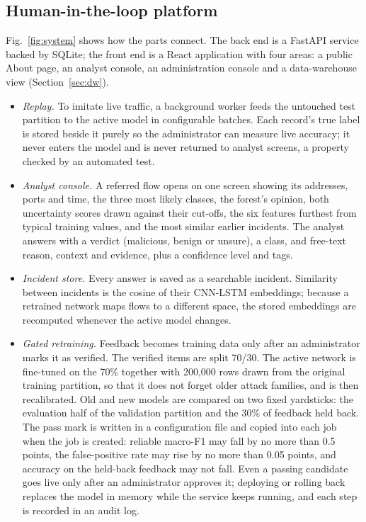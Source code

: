 \documentclass[conference]{IEEEtran}
\begin{document}
\subsection{Human-in-the-loop platform}
Fig.~\ref{fig:system} shows how the parts connect. The back end is a FastAPI service backed by
SQLite; the front end is a React application with four areas: a public About page, an analyst
console, an administration console and a data-warehouse view (Section~\ref{sec:dw}).
\begin{itemize}
\item \textit{Replay.} To imitate live traffic, a background worker feeds the untouched test
partition to the active model in configurable batches. Each record's true label is stored beside
it purely so the administrator can measure live accuracy; it never enters the model and is never
returned to analyst screens, a property checked by an automated test.
\item \textit{Analyst console.} A referred flow opens on one screen showing its addresses, ports
and time, the three most likely classes, the forest's opinion, both uncertainty scores drawn
against their cut-offs, the six features furthest from typical training values, and the most
similar earlier incidents. The analyst answers with a verdict (malicious, benign or unsure), a
class, and free-text reason, context and evidence, plus a confidence level and tags.
\item \textit{Incident store.} Every answer is saved as a searchable incident. Similarity between
incidents is the cosine of their CNN-LSTM embeddings; because a retrained network maps flows to a
different space, the stored embeddings are recomputed whenever the active model changes.
\item \textit{Gated retraining.} Feedback becomes training data only after an administrator marks
it as verified. The verified items are split 70/30. The active network is fine-tuned on the 70\%
together with 200,000 rows drawn from the original training partition, so that it does not forget
older attack families, and is then recalibrated. Old and new models are compared on two fixed
yardsticks: the evaluation half of the validation partition and the 30\% of feedback held back.
The pass mark is written in a configuration file and copied into each job when the job is
created: reliable macro-F1 may fall by no more than 0.5 points, the false-positive rate may rise
by no more than 0.05 points, and accuracy on the held-back feedback may not fall. Even a passing
candidate goes live only after an administrator approves it; deploying or rolling back replaces
the model in memory while the service keeps running, and each step is recorded in an audit log.
\end{itemize}
\end{document}
